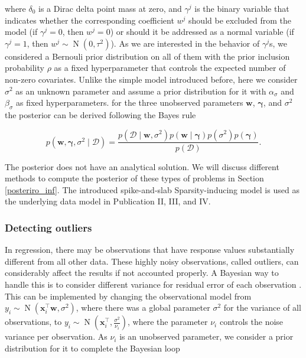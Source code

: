 \documentclass[dissertation,math,vertlayout,pdfa,colorlinks]{aaltoseries}
\newcommand{\bw}{\bm{w}}
\newcommand{\bD}{\mathcal{D}}
\DeclareMathOperator{\normalpdf}{N}
\newcommand{\tp}{^{\top}}
\begin{document}
\noindent where $\delta_0$ is a Dirac delta point mass at zero, and $\gamma^j$ is the binary variable that indicates whether the corresponding coefficient $w^j$ should be excluded from the model (if $\gamma^j=0$, then $w^j=0$) or should it be addressed as a normal variable (if $\gamma^j=1$, then $w^j \sim \normalpdf(0, \tau^2)$). As we are interested in the behavior of $\gamma^j$s, we considered a Bernouli prior distribution on all of them with the prior inclusion probability $\rho$ as a fixed hyperparameter that controls the expected number of non-zero covariates. Unlike the simple model introduced before, here we consider $\sigma^{2}$ as an unknown parameter and assume a prior distribution for it with $\alpha_{\sigma}$ and $\beta_{\sigma}$ as fixed hyperparameters. for the three unobserved parameters $\bw$, $\bm{\gamma}$, and $\sigma^2$ the posterior can be derived following the Bayes rule

\begin{equation}\label{Eq:Bayes_rule_ss_reg}
p(\bw, \bm{\gamma}, \sigma^2 \mid \bD) = \frac{p(\bD \mid \bw, \sigma^2)p(\bw \mid \bm{\gamma})p(\sigma^2)p(\bm{\gamma})}{p(\bD)}.
\end{equation} 

The posterior does not have an analytical solution. We will discuss different methods to compute the posterior of these types of problems in Section \ref{posteriro_inf}. The introduced spike-and-slab Sparsity-inducing model is used as the underlying data model in Publication II, III, and IV. 








\subsubsection{Detecting outliers}

In regression, there may be observations that have response values substantially different from all other data. These highly noisy observations, called outliers, can considerably affect the results if not accounted properly. A Bayesian way to handle this is to consider different variance for residual error of each observation \cite{Bayesian_ARD2007}. This can be implemented by changing the observational model from $y_i\sim \normalpdf(\bm{x}_i\tp\bw,\sigma^2)$, where there was a global parameter $\sigma^2$ for the variance of all observations, to $y_i \sim \normalpdf(\bm{x}_i\tp,\frac{\sigma^2}{\nu_i})$, where the parameter $\nu_i$ controls the noise variance per observation. As $\nu_i$ is an unobserved parameter, we consider a prior distribution for it to complete the Bayesian loop
\end{document}
